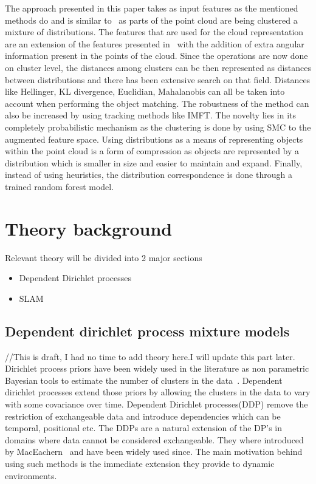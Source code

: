\documentclass[twoside,hidelinks]{article}
\begin{document}
The approach presented in this paper takes as input features as the mentioned methods do and is similar to~\cite{objectDisc} as parts of the point cloud are being clustered a mixture of distributions. The features that are used for the cloud representation are an extension of the features presented in~\cite{smcddp} with the addition of extra angular information present in the points of the cloud. Since the operations are now done on cluster level, the distances among clusters can be then represented as distances between distributions and there has been extensive search on that field. Distances like Hellinger, KL divergence, Euclidian, Mahalanobis can all be taken into account when performing the object matching. The robustness of the method can also be increased by using tracking methods like IMFT. The novelty lies in its completely probabilistic mechanism as the clustering is done by using SMC to the augmented feature space. Using distributions as a means of representing objects within the point cloud is a form of compression as objects are represented by a distribution which is smaller in size and easier to maintain and expand. Finally, instead of using heuristics, the distribution correspondence is done through a trained random forest model.




\section{Theory background}
\label{sec:theory}

Relevant theory will be divided into 2 major sections
\begin{itemize}
	\item Dependent Dirichlet processes
	\item SLAM
\end{itemize}



\subsection{Dependent dirichlet process mixture models}
//This is draft, I had no time to add theory here.I will update this part later.
Dirichlet process priors have been widely used in the literature as non parametric Bayesian tools to estimate the number of clusters in the data~\cite{antoniak}. Dependent dirichlet processes extend those priors by allowing the clusters in the data to vary with some covariance over time. Dependent Dirichlet processes(DDP) remove the restriction of exchangeable data and introduce dependencies which can be temporal, positional etc. The DDPs are a natural extension of the DP's in domains where data cannot be considered exchangeable. They where introduced by MacEachern~\cite{theory:ddp} and have been widely used since. The main motivation behind using such methods is the immediate extension they provide to dynamic environments. 
\end{document}
